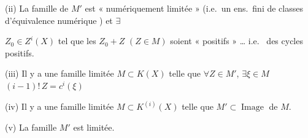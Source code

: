 \documentclass[11pt,a4paper]{article}
\begin{document}
(ii) La famille de $M'$ est « numériquement limitée » (i.e.\ un ens.\ fini
de classes d'équivalence numérique \ill{}) et $\exists$
\struck{\ill{}} 

$Z_{0} \in Z^{i}(X)$ tel que les  $Z_{0} + Z$
$(Z \in M)$ soient « positifs » … i.e.\  des cycles
positifs.

(iii)  Il y a une famille limitée $M \subset K(X)$ telle que
$\forall Z \in M'$, $\exists \xi \in M$ 
$(i-1)!\, Z = c^{i}(\xi)$ \struck{\ill{}}

(iv) Il y a une famille limitée $M \subset K^{(i)}(X)$ telle que
$M' \subset \operatorname{Image}$ de $M$.

(v) La famille $M'$ est  limitée.

\end{document}
